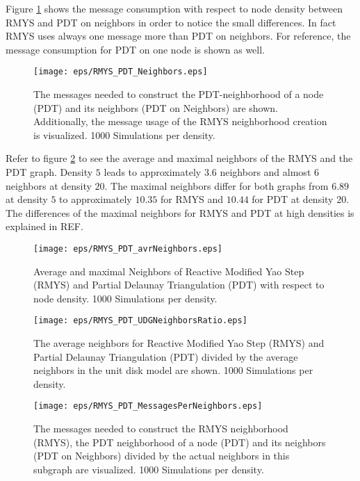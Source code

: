 Figure \ref{fig:RMYS_PDT_Neighbors} shows the message consumption with respect to node density between RMYS and PDT on neighbors in order to notice the small differences.
In fact RMYS uses always one message more than PDT on neighbors.
For reference, the message consumption for PDT on one node is shown as well.

\begin{figure}[h!]
\centering
\texttt{[image: eps/RMYS\_PDT\_Neighbors.eps]}
\caption{The messages needed to construct the PDT-neighborhood of a node (PDT) and its neighbors (PDT on Neighbors) are shown. Additionally, the message usage of the RMYS neighborhood creation is visualized. 1000 Simulations per density.}
\label{fig:RMYS_PDT_Neighbors}
\end{figure}


Refer to figure \ref{fig:RMYS_PDT_avrNeighbors} to see the average and maximal neighbors of the RMYS and the PDT graph.
Density $5 $ leads to approximately $3.6 $ neighbors and almost $6 $ neighbors at density $20 $.
The maximal neighbors differ for both graphs from $6.89 $ at density $5 $ to approximately $10.35 $ for RMYS and $10.44 $ for PDT at density $20 $.
The differences of the maximal neighbors for RMYS and PDT at high densities is explained in REF.

\begin{figure}[h!]
\centering
\texttt{[image: eps/RMYS\_PDT\_avrNeighbors.eps]}
\caption{Average and maximal Neighbors of Reactive Modified Yao Step (RMYS) and Partial Delaunay Triangulation (PDT) with respect to node density. 1000 Simulations per density.}
\label{fig:RMYS_PDT_avrNeighbors}
\end{figure}




\begin{figure}[h!]
\centering
\texttt{[image: eps/RMYS\_PDT\_UDGNeighborsRatio.eps]}
\caption{The average neighbors for Reactive Modified Yao Step (RMYS) and Partial Delaunay Triangulation (PDT) divided by the average neighbors in the unit disk model are shown. 1000 Simulations per density.}
\label{fig:RMYS_PDT_UDGNeighborsRatio}
\end{figure}

\begin{figure}[h!]
\centering
\texttt{[image: eps/RMYS\_PDT\_MessagesPerNeighbors.eps]}
\caption{The messages needed to construct the RMYS neighborhood (RMYS), the PDT neighborhood of a node (PDT) and its neighbors (PDT on Neighbors) divided by the actual neighbors in this subgraph are visualized. 1000 Simulations per density.}
\label{fig:RMYS_PDT_MessagesPerNeighbors}
\end{figure}


